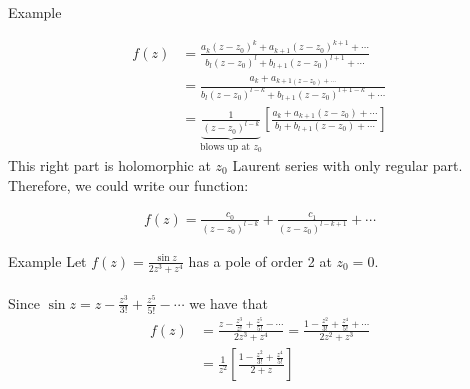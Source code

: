 \begin{parag}{Example}
\begin{itemize}
				\begin{align*} 
					f\left(z\right) &= \frac{a_k\left(z - z_0\right)^{k} + a_{k + 1}\left(z - z_0\right)^{k+1} + \cdots}{b_l	\left(z - z_0\right)^{l} + b_{l + 1}\left(z - z_0\right)^{l + 1} + \cdots}\\
					&= \frac{a_k + a_{k+1\left(z -z_0\right) + \cdots}}{b_{l}\left(z - z_0\right)^{l - k} + b_{l + 1}\left(z - z_0\right)^{l + 1 - k} + \cdots}\\
					&= \underbrace{\frac{1}{\left(z - z_0\right)^{l - k}}}_{\text{blows up at } z_0}\left[\frac{a_k + a_{k+1}\left(z - z_0\right) + \cdots}{b_{l} + b_{l + 1}\left(z - z_0\right) + \cdots}\right]
				\end{align*}
				This right part is holomorphic at  $z_0$ Laurent series with only regular part. Therefore, we could write our function:

				\begin{align*} 
					f\left(z\right) = \frac{c_0}{\left(z - z_0\right)^{l - k}} + \frac{c_1}{\left(z - z_0\right)^{l - k + 1}} + \cdots
				\end{align*}
	\end{itemize}
	\begin{subparag}{Example}
	    Let $f\left(z\right) = \frac{\sin z}{2z^3 + z^{4}}$ has a pole of order 2 at $z_0 = 0$. \\
		$ $\\
		Since $\sin z = z - \frac{z^3}{3!} + \frac{z^{5}}{5!} - \cdots$ we have that 
		\begin{align*} 
			f\left(z\right) &= \frac{z - \frac{z^3}{z!} + \frac{z^{5}}{5!} - \cdots}{2z^3 + z^{4}} =  \frac{1 - \frac{z^2}{3!} + \frac{z^{4}}{5!} + \cdots}{2z^2 + z^3}\\
			&=  \frac{1}{z^2}\left[\frac{1 - \frac{z^2}{3!} + \frac{z^{4}}{5!}}{2 + z}\right]
		\end{align*}
	\end{subparag}
\end{parag}




